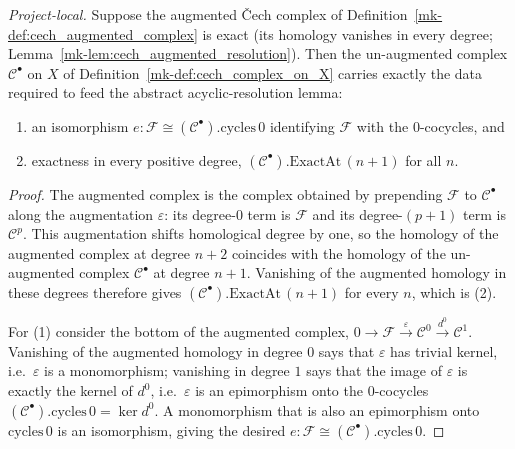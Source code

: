 \begin{lemma}\label{mk-lem:cechAugmented_to_acyclicResolutionInput}
  \leanok

  \textit{Project-local.}
  Suppose the augmented {\v C}ech complex of
  Definition~\ref{mk-def:cech_augmented_complex} is exact (its homology vanishes in every
  degree; Lemma~\ref{mk-lem:cech_augmented_resolution}). Then the un-augmented complex
  \(\mathcal{C}^\bullet\) on
  \(X\) of Definition~\ref{mk-def:cech_complex_on_X} carries exactly the data required to
  feed the abstract acyclic-resolution lemma:
  \begin{enumerate}
    \item an isomorphism \(e : \mathcal{F} \cong (\mathcal{C}^\bullet).\mathrm{cycles}\,0\)
      identifying \(\mathcal{F}\) with the \(0\)-cocycles, and
    \item exactness in every positive degree, \((\mathcal{C}^\bullet).\mathrm{ExactAt}\,(n+1)\)
      for all \(n\).
  \end{enumerate}
\end{lemma}
\begin{proof}
  \leanok
  The augmented complex is the complex obtained by prepending \(\mathcal{F}\) to
  \(\mathcal{C}^\bullet\) along the augmentation \(\varepsilon\): its degree-\(0\) term
  is \(\mathcal{F}\) and its degree-\((p+1)\) term is \(\mathcal{C}^p\). This
  augmentation shifts homological degree by one, so the homology of the augmented
  complex at degree \(n+2\) coincides with the homology of the un-augmented complex
  \(\mathcal{C}^\bullet\) at degree \(n+1\). Vanishing of the augmented homology in
  these degrees therefore gives \((\mathcal{C}^\bullet).\mathrm{ExactAt}\,(n+1)\) for
  every \(n\), which is (2).

  For (1) consider the bottom of the augmented complex,
  \(0 \to \mathcal{F} \xrightarrow{\varepsilon} \mathcal{C}^0 \xrightarrow{d^0}
  \mathcal{C}^1\). Vanishing of the augmented homology in degree \(0\) says that
  \(\varepsilon\) has trivial kernel, i.e.\ \(\varepsilon\) is a monomorphism;
  vanishing in degree \(1\) says that the image of \(\varepsilon\) is exactly the
  kernel of \(d^0\), i.e.\ \(\varepsilon\) is an epimorphism onto the \(0\)-cocycles
  \((\mathcal{C}^\bullet).\mathrm{cycles}\,0 = \ker d^0\). A monomorphism that is also
  an epimorphism onto \(\mathrm{cycles}\,0\) is an isomorphism, giving the desired
  \(e : \mathcal{F} \cong (\mathcal{C}^\bullet).\mathrm{cycles}\,0\).
\end{proof}

